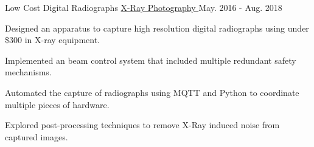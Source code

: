

\begin{cventries}

  \cventry
    {Low Cost Digital Radiographs} %
		{
			\href{https://github.com/TidalPaladin/xray-controller.git}
			{X-Ray Photography \faGithubSquare}
		} %
    {May. 2016 - Aug. 2018} %
    {} %
	{
	\begin{cvitems}
		\item {
			Designed an apparatus to capture high resolution
			digital radiographs using under \$300 in X-ray equipment.
		}
		\item {
			Implemented an beam control system that included multiple
			redundant safety mechanisms.
		}
		\item {
			Automated the capture of radiographs using MQTT and Python
			to coordinate multiple pieces of hardware.
		}
		\item {
			Explored post-processing techniques to remove X-Ray induced
			noise from captured images.
		}
	\end{cvitems}
	}

\end{cventries}
